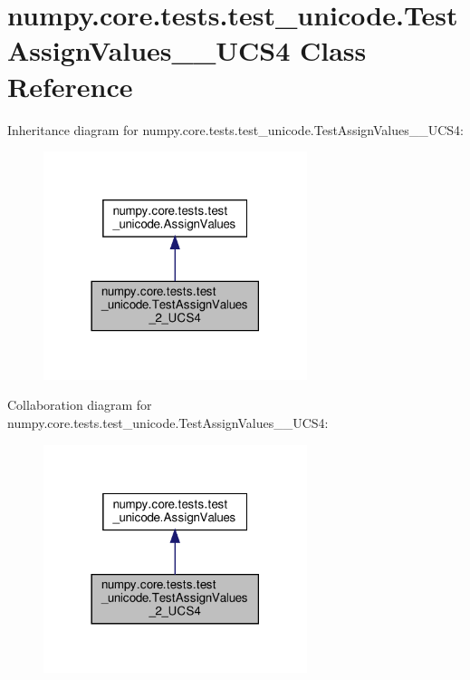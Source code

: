 \hypertarget{classnumpy_1_1core_1_1tests_1_1test__unicode_1_1TestAssignValues__2__UCS4}{}\section{numpy.\+core.\+tests.\+test\+\_\+unicode.\+Test\+Assign\+Values\+\_\+\_\+\+U\+C\+S4 Class Reference}
\label{classnumpy_1_1core_1_1tests_1_1test__unicode_1_1TestAssignValues__2__UCS4}


Inheritance diagram for numpy.\+core.\+tests.\+test\+\_\+unicode.\+Test\+Assign\+Values\+\_\+\_\+\+U\+C\+S4\+:
\nopagebreak
\begin{figure}[H]
\begin{center}
\leavevmode
\includegraphics[width=218pt]{classnumpy_1_1core_1_1tests_1_1test__unicode_1_1TestAssignValues__2__UCS4__inherit__graph}
\end{center}
\end{figure}


Collaboration diagram for numpy.\+core.\+tests.\+test\+\_\+unicode.\+Test\+Assign\+Values\+\_\+\_\+\+U\+C\+S4\+:
\nopagebreak
\begin{figure}[H]
\begin{center}
\leavevmode
\includegraphics[width=218pt]{classnumpy_1_1core_1_1tests_1_1test__unicode_1_1TestAssignValues__2__UCS4__coll__graph}
\end{center}
\end{figure}
